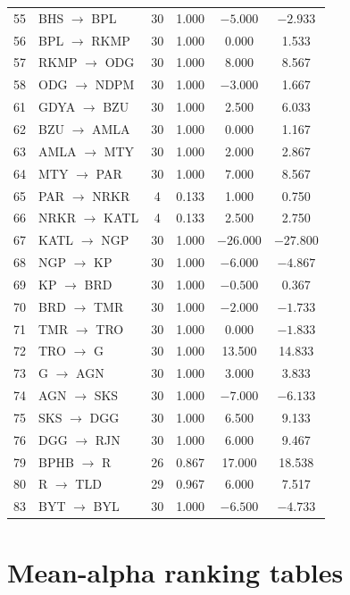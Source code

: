 \documentclass[a4paper,fleqn]{cas-dc}
\begin{document}
\begin{table}[width=\textwidth,pos=t]
\begin{tabular*}{\tblwidth}{@{\extracolsep{\fill}}r l c c c c@{}}
55 & BHS $\to$ BPL & 30 & 1.000 &  $-5.000$ &  $-2.933$ \\
56 & BPL $\to$ RKMP & 30 & 1.000 &   0.000 &   1.533 \\
57 & RKMP $\to$ ODG & 30 & 1.000 &   8.000 &   8.567 \\
58 & ODG $\to$ NDPM & 30 & 1.000 &  $-3.000$ &   1.667 \\
61 & GDYA $\to$ BZU & 30 & 1.000 &   2.500 &   6.033 \\
62 & BZU $\to$ AMLA & 30 & 1.000 &   0.000 &   1.167 \\
63 & AMLA $\to$ MTY & 30 & 1.000 &   2.000 &   2.867 \\
64 & MTY $\to$ PAR & 30 & 1.000 &   7.000 &   8.567 \\
65 & PAR $\to$ NRKR &  4 & 0.133 &   1.000 &   0.750 \\
66 & NRKR $\to$ KATL &  4 & 0.133 &   2.500 &   2.750 \\
67 & KATL $\to$ NGP & 30 & 1.000 & $-26.000$ & $-27.800$ \\
68 & NGP $\to$ KP   & 30 & 1.000 &  $-6.000$ &  $-4.867$ \\
69 & KP $\to$ BRD   & 30 & 1.000 &  $-0.500$ &   0.367 \\
70 & BRD $\to$ TMR  & 30 & 1.000 &  $-2.000$ &  $-1.733$ \\
71 & TMR $\to$ TRO  & 30 & 1.000 &   0.000 &  $-1.833$ \\
72 & TRO $\to$ G    & 30 & 1.000 &  13.500 &  14.833 \\
73 & G $\to$ AGN    & 30 & 1.000 &   3.000 &   3.833 \\
74 & AGN $\to$ SKS  & 30 & 1.000 &  $-7.000$ &  $-6.133$ \\
75 & SKS $\to$ DGG  & 30 & 1.000 &   6.500 &   9.133 \\
76 & DGG $\to$ RJN  & 30 & 1.000 &   6.000 &   9.467 \\
79 & BPHB $\to$ R   & 26 & 0.867 &  17.000 &  18.538 \\
80 & R $\to$ TLD    & 29 & 0.967 &   6.000 &   7.517 \\
83 & BYT $\to$ BYL  & 30 & 1.000 &  $-6.500$ &  $-4.733$ \\
\bottomrule
\end{tabular*}
\end{table}
\endgroup

\section{Mean-alpha ranking tables}
\label{app:mean}
\end{document}
